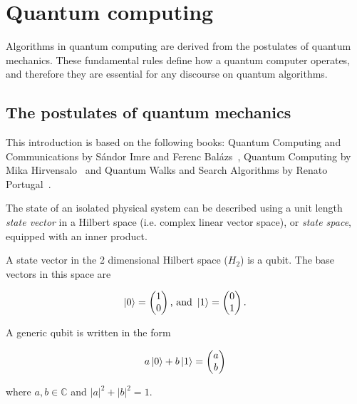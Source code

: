 \chapter{Quantum computing}

Algorithms in quantum computing are derived from the postulates of quantum mechanics. These fundamental rules define how a quantum computer operates, and therefore they are essential for any discourse on quantum algorithms.

\section{The postulates of quantum mechanics}

This introduction is based on the following books: Quantum Computing and Communications by Sándor Imre and Ferenc Balázs~\cite{ImreSandor}, Quantum Computing by Mika Hirvensalo~\cite{Hirvensalo} and Quantum Walks and Search Algorithms by Renato Portugal~\cite{Portugal}.


The state of an isolated physical system can be described using a unit length \textit{state vector} in a Hilbert space (i.e. complex linear vector space), or \textit{state space}, equipped with an inner product.

\begin{definition}[Qubit]
A state vector in the 2 dimensional Hilbert space ($H_2$) is a qubit. The base vectors in this space are
\end{definition}

\begin{align*}
\ket{0} = \begin{pmatrix} 1 \\ 0 \end{pmatrix} \text{, and } \ket{1} = \begin{pmatrix} 0 \\ 1 \end{pmatrix}.
\end{align*}

A generic qubit is written in the form

\begin{align*}
a\ket{0} + b\ket{1} = \begin{pmatrix} a \\ b \end{pmatrix}
\end{align*}

where $a, b \in{} \mathds{C}$ and $|a|^2 + |b|^2 = 1$.

